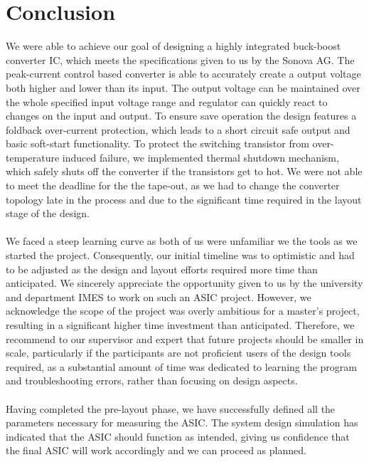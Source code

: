 \section{Conclusion}
\label{chap:conclustion}

We were able to achieve our goal of designing a highly integrated buck-boost converter \ac{IC}, which meets the specifications given to us by the Sonova AG. The peak-current control based converter is able to accurately create a output voltage both higher and lower than its input. The output voltage can be maintained over the whole specified input voltage range and regulator can quickly react to changes on the input and output. To ensure save operation the design features a foldback over-current protection, which leads to a short circuit safe output and basic soft-start functionality. To protect the switching transistor from over-temperature induced failure, we implemented thermal shutdown mechanism, which safely shuts off the converter if the transistors get to hot. We were not able to meet the deadline for the the tape-out, as we had to change the converter topology late in the process and due to the significant time required in the layout stage of the design.\\\\
We faced a steep learning curve as both of us were unfamiliar we the tools as we started the project. Consequently, our initial timeline was to optimistic and had to be adjusted as the design and layout efforts required more time than anticipated. We sincerely appreciate the opportunity given to us by the university and department IMES to work on such an \ac{ASIC} project. However, we acknowledge the scope of the project was overly ambitious for a master's project, resulting in a significant higher time investment than anticipated.  Therefore, we recommend to our supervisor and expert that future projects should be smaller in scale, particularly if the participants are not proficient users of the design tools required, as a substantial amount of time was dedicated to learning the program and troubleshooting errors, rather than focusing on design aspects.\\\\
Having completed the pre-layout phase, we have successfully defined all the parameters necessary for measuring the ASIC. The system design simulation has indicated that the \ac{ASIC} should function as intended, giving us confidence that the final ASIC will work accordingly and we can proceed as planned.




\clearpage